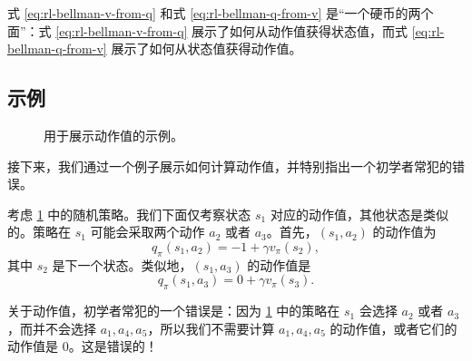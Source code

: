 式 \cref{eq:rl-bellman-v-from-q} 和式 \cref{eq:rl-bellman-q-from-v} 是“一个硬币的两个面”：式 \cref{eq:rl-bellman-v-from-q} 展示了如何从动作值获得状态值，而式 \cref{eq:rl-bellman-q-from-v} 展示了如何从状态值获得动作值。

\subsection{示例}
\label{sec:rl-bellman-action-value-example}

\begin{figure}[H]
\centering
{}
\caption{用于展示动作值的示例。}
\label{fig:rl-bellman-action-value-example}
\end{figure}

接下来，我们通过一个例子展示如何计算动作值，并特别指出一个初学者常犯的错误。

考虑 \cref{fig:rl-bellman-action-value-example} 中的随机策略。我们下面仅考察状态 $s_1$ 对应的动作值，其他状态是类似的。策略在 $s_1$ 可能会采取两个动作 $a_2$ 或者 $a_3$。首先，$(s_1, a_2)$ 的动作值为
\begin{equation*}
q_\pi(s_1, a_2) = -1 + \gamma v_\pi(s_2),
\end{equation*}
其中 $s_2$ 是下一个状态。类似地，$(s_1, a_3)$ 的动作值是
\begin{equation*}
q_\pi(s_1, a_3) = 0 + \gamma v_\pi(s_3).
\end{equation*}

关于动作值，初学者常犯的一个错误是：因为 \cref{fig:rl-bellman-action-value-example} 中的策略在 $s_1$ 会选择 $a_2$ 或者 $a_3$，而并不会选择 $a_1, a_4, a_5$，所以我们不需要计算 $a_1, a_4, a_5$ 的动作值，或者它们的动作值是 $0$。这是错误的！

